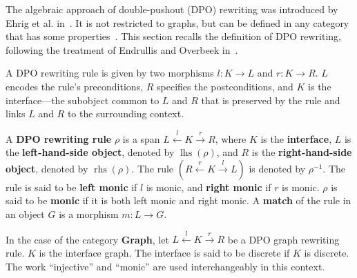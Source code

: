 The algebraic approach of double-pushout (DPO) rewriting was introduced by Ehrig et al. in~\cite{ehrig1973graph}. It is not restricted to graphs, but can be defined in any category that has some properties~\cite{ehrig2006fundamentals,lack2004adhesive}. This section recalls the definition of DPO rewriting, following the treatment of Endrullis and Overbeek in~\cite{endrullis2024generalized_icgt}.

 A DPO rewriting rule is given by two morphisms \(l: K \to L\) and \(r: K \to R\). \(L\) encodes the rule's preconditions, \(R\) specifies the postconditions, and \(K\) is the interface—the subobject common to \(L\) and \(R\) that is preserved by the rule and links \(L\) and \(R\) to the surrounding context.
\begin{definition} 
  \label{def:grs:dpo_rule}
A \textbf{DPO rewriting rule} $\rho$ is a span \( L \overset{l}{\leftarrow} K \overset{r}{\rightarrow} R \), where \( K \) is the \textbf{interface}, \( L \) is the \textbf{left-hand-side object}, denoted by \( \operatorname{lhs}(\rho) \), and \( R \) is the \textbf{right-hand-side object}, denoted by \( \operatorname{rhs}(\rho) \). The rule $(R \overset{r}{\leftarrow} K \overset{l}{\rightarrow} L)$ is denoted by $\rho^{-1}$. The rule is said to be \textbf{left monic} if \( l \) is monic, and \textbf{right monic} if \( r \) is monic. 
$\rho$ is said to be \textbf{monic} if it is both left monic and right monic.
A \textbf{match} of the rule in an object \( G \) is a morphism \( m: L \rightarrow G \). 
\end{definition}
In the case of the category \textbf{Graph}, 
let \( L \overset{l}{\leftarrow} K \overset{r}{\rightarrow} R \) be a DPO graph rewriting rule. $K$ is the interface graph. The interface is said to be discrete if $K$ is discrete.
The work \enquote{injective} and \enquote{monic} are used interchangeably in this context.

